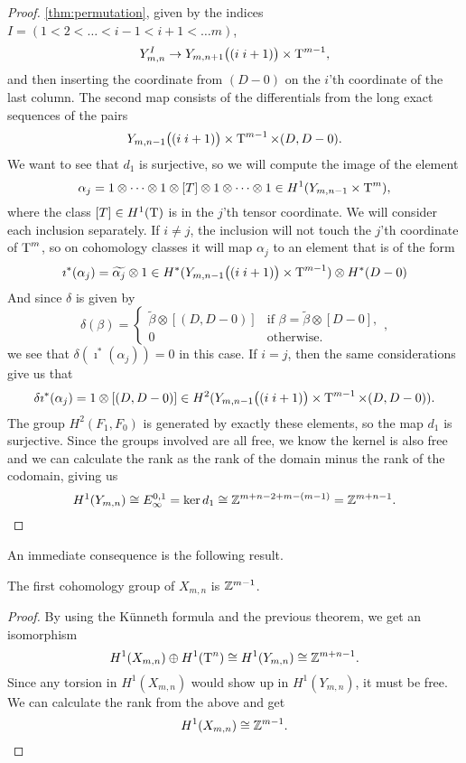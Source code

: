 \begin{proof}
  \ref{thm:permutation}, given by the indices $I = (1 < 2 < \dots <
  i-1 < i+1 < \dots m)$,
  \[ Y_{m,n}^I \to Y_{m,n+1}\big((i \; i+1)\big) \times \operatorname{T}^{m-1}, \]
  and then inserting the coordinate from $(D-0)$ on the $i$'th
  coordinate of the last column.
  The second map consists of the differentials from the long exact
  sequences of the pairs
  \[ Y_{m,n-1}\big((i\; i+1)\big) \times \operatorname{T}^{m-1}\times (D,D-0). \]
  We want to see that $d_1$ is surjective, so we will compute the
  image of the element 
  \[ \alpha_j = 1\otimes\dots\otimes 1\otimes [T] \otimes 1 \otimes
  \dots
  \otimes 1 \in H^1(Y_{m,n-1}\times \operatorname{T}^{m}),\] 
  where the class $[T]\in H^1(\operatorname{T})$ is in the $j$'th tensor coordinate.
  We will consider each inclusion separately. If $i \neq j$, the
  inclusion will not touch the $j$'th coordinate of $\operatorname{T}^m$, so on
  cohomology classes it will map $\alpha_j$ to an element that is of
  the form
  \[ \imath^*(\alpha_j) = \widetilde{\alpha_j}\otimes 1 \in
  H^*(Y_{m,n-1}\big((i\; i+1) \big) \times \operatorname{T}^{m-1}) \otimes
  H^*(D-0) \]
  And since $\delta$ is given by
  \[ \delta(\beta) =
  \begin{cases}
    \widetilde{\beta}\otimes [(D,D-0)] & \text{if } \beta =
    \widetilde{\beta}\otimes [D-0], \\
    0 & \text{otherwise}.
  \end{cases}, \]
  we see that $\delta(\imath^*(\alpha_j)) = 0$ in this case. If $i =
  j$, then the same considerations give us that
  \[ \delta\imath^*(\alpha_j) = 1 \otimes [(D,D-0)] \in
  H^2(Y_{m,n-1}\big((i\; i+1) \big) \times \operatorname{T}^{m-1}\times (D,D-0)). \]
  The group $H^2(F_1,F_0)$ is generated by exactly these elements, so
  the map $d_1$ is surjective. Since the groups involved are all free,
  we know the kernel is also free and we can calculate the rank as the
  rank of the domain minus the rank of the codomain, giving us
  \[ H^1(Y_{m,n}) \cong E_{\infty}^{0,1} = \ker d_1 \cong
  \mathbb{Z}^{m+n-2+m-(m-1)} = \mathbb{Z}^{m+n-1}. \]
\end{proof}

An immediate consequence is the following result.

\begin{corollary}
  \label{cor:1-kohom}
  The first cohomology group of $X_{m,n}$ is $\mathbb{Z}^{m-1}$.
\end{corollary}
\begin{proof}
  By using the K\"unneth formula and the previous theorem, we get an
  isomorphism
  \[ H^1(X_{m,n}) \oplus H^1(\operatorname{T}^n) \cong  H^1(Y_{m,n}) \cong
  \mathbb{Z}^{m+n-1}. \]
  Since any torsion in $H^1(X_{m,n})$ would show up in $H^1(Y_{m,n})$,
  it must be free. We can calculate the rank from the above and get
  \[ H^1(X_{m,n}) \cong \mathbb{Z}^{m-1}. \]
\end{proof}

